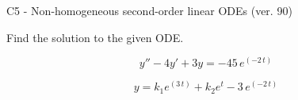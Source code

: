 \begin{exercise}
  \begin{exerciseTitle}C5 - Non-homogeneous second-order linear ODEs (ver. 90)\end{exerciseTitle}
  \begin{exerciseStatement}
    
Find the solution to the given ODE.

    
\[y''-4y'+3y = -45 \, e^{\left(-2 \, t\right)}\]

  \end{exerciseStatement}
  \begin{exerciseAnswer}
    
\[y= k_{1} e^{\left(3 \, t\right)} + k_{2} e^{t} - 3 \, e^{\left(-2 \, t\right)}\]

  \end{exerciseAnswer}
\end{exercise}